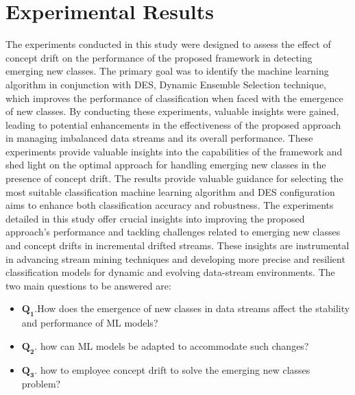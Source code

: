 \section{Experimental Results}
\label{sec:results}
The experiments conducted in this study were designed to assess the effect of concept drift on the performance of the proposed framework in detecting emerging new classes. The primary goal was to identify the machine learning algorithm in conjunction with DES, Dynamic Ensemble Selection technique, which improves the performance of classification when faced with the emergence of new classes. By conducting these experiments, valuable insights were gained, leading to potential enhancements in the effectiveness of the proposed approach in managing imbalanced data streams and its overall performance. These experiments provide valuable insights into the capabilities of the framework and shed light on the optimal approach for handling emerging new classes in the presence of concept drift. The results provide valuable guidance for selecting the most suitable classification machine learning algorithm and DES configuration aims to enhance both classification accuracy and robustness. The experiments detailed in this study offer crucial insights into improving the proposed approach's performance and tackling challenges related to emerging new classes and concept drifts in incremental drifted streams. These insights are instrumental in advancing stream mining techniques and developing more precise and resilient classification models for dynamic and evolving data-stream environments. The two main questions to be answered are:

\begin{itemize}
  \setlength{\itemindent}{-.5in}
  
  \item $\pmb{Q_1}$.How does the emergence of new classes in data streams affect the stability and performance of ML models?
  \item $\pmb{Q_2}$. how can ML models be adapted to accommodate such changes?
  \item $\pmb{Q_3}$. how to employee concept drift to solve the emerging new classes problem? 
  \end{itemize}

